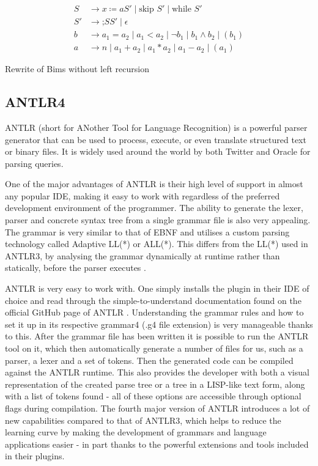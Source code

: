 

\begin{table}[htb!]
\centering
    \begin{align*}
    S  & \rightarrow  x \coloneqq a S' \mid \text{skip } S' \mid \text{while } S'\\
    S' & \rightarrow \text{;} S S'\mid \epsilon\\
    b  & \rightarrow a_1 = a_2 \mid a_1 < a_2 \mid \neg b_1 \mid b_1 \land b_2 \mid (b_1)\\
    a  & \rightarrow n \mid a_1 + a_2 \mid a_1 * a_2 \mid a_1 - a_2 \mid (a_1)
    \end{align*}
    \caption{Rewrite of Bims without left recursion}
    \label{tab:bimsrewrite}
\end{table}


\subsection{ANTLR4}

ANTLR (short for ANother Tool for Language Recognition) is a powerful parser generator that can be used to process, execute, or even translate structured text or binary files. It is widely used around the world by both Twitter and Oracle for parsing queries. \cite{ANTLR_About}

One of the major advantages of ANTLR is their high level of support in almost any popular IDE, making it easy to work with regardless of the preferred development environment of the programmer. The ability to generate the lexer, parser and concrete syntax tree from a single grammar file is also very appealing. The grammar is very similar to that of EBNF and utilises a custom parsing technology called Adaptive LL(*) or ALL(*). This differs from the LL(*) used in ANTLR3, by analysing the grammar dynamically at runtime rather than statically, before the parser executes \cite{Parr2014}.

ANTLR is very easy to work with. One simply installs the plugin in their IDE of choice and read through the simple-to-understand documentation found on the official GitHub page of ANTLR \cite{ANTLR_Documentation}. Understanding the grammar rules and how to set it up in its respective grammar4 (.g4 file extension) is very manageable thanks to this. After the grammar file has been written it is possible to run the ANTLR tool on it, which then automatically generate a number of files for us, such as a parser, a lexer and a set of tokens. Then the generated code can be compiled against the ANTLR runtime. This also provides the developer with both a visual representation of the created parse tree or a tree in a LISP-like text form, along with a list of tokens found - all of these options are accessible through optional flags during compilation. The fourth major version of ANTLR introduces a lot of new capabilities compared to that of ANTLR3, which helps to reduce the learning curve by making the development of grammars and language applications easier - in part thanks to the powerful extensions and tools included in their plugins.



